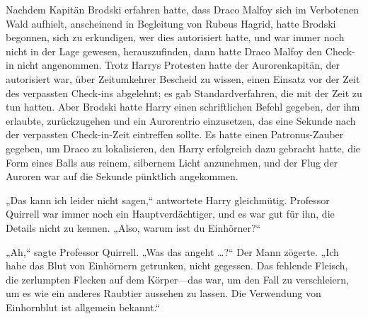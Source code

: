 Nachdem Kapitän Brodski erfahren hatte, dass Draco Malfoy sich im Verbotenen Wald aufhielt, anscheinend in Begleitung von Rubeus Hagrid, hatte Brodski begonnen, sich zu erkundigen, wer dies autorisiert hatte, und war immer noch nicht in der Lage gewesen, herauszufinden, dann hatte Draco Malfoy den Check-in nicht angenommen. Trotz Harrys Protesten hatte der Aurorenkapitän, der autorisiert war, über Zeitumkehrer Bescheid zu wissen, einen Einsatz vor der Zeit des verpassten Check-ins abgelehnt; es gab Standardverfahren, die mit der Zeit zu tun hatten. Aber Brodski hatte Harry einen schriftlichen Befehl gegeben, der ihm erlaubte, zurückzugehen und ein Aurorentrio einzusetzen, das eine Sekunde nach der verpassten Check-in-Zeit eintreffen sollte. Es hatte einen Patronus-Zauber gegeben, um Draco zu lokalisieren, den Harry erfolgreich dazu gebracht hatte, die Form eines Balls aus reinem, silbernem Licht anzunehmen, und der Flug der Auroren war auf die Sekunde pünktlich angekommen.

„Das kann ich leider nicht sagen,“ antwortete Harry gleichmütig. Professor Quirrell war immer noch ein Hauptverdächtiger, und es war gut für ihn, die Details nicht zu kennen. „Also, warum isst du Einhörner?“

„Ah,“ sagte Professor Quirrell. „Was das angeht …?“ Der Mann zögerte. „Ich habe das Blut von Einhörnern getrunken, nicht gegessen. Das fehlende Fleisch, die zerlumpten Flecken auf dem Körper—das war, um den Fall zu verschleiern, um es wie ein anderes Raubtier aussehen zu lassen. Die Verwendung von Einhornblut ist allgemein bekannt.“


